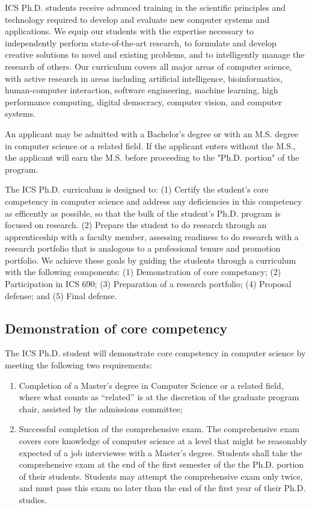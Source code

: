 \documentclass[12pt]{article}
\begin{document}
ICS Ph.D. students receive advanced training in the scientific principles and
technology required to develop and evaluate new computer systems and
applications. We equip our students with the expertise necessary to
independently perform state-of-the-art research, to formulate and develop
creative solutions to novel and existing problems, and to intelligently
manage the research of others. Our curriculum covers all major areas of
computer science, with active research in areas including artificial
intelligence, bioinformatics, human-computer interaction, software
engineering, machine learning, high performance computing, digital
democracy, computer vision, and computer systems.

An applicant may be admitted with a Bachelor's degree or with an
M.S. degree in computer science or a related field. If the applicant enters
without the M.S., the applicant will earn the M.S. before proceeding to the
"Ph.D. portion" of the program.

The ICS Ph.D. curriculum is designed to: (1) Certify the student's core
competency in computer science and address any deficiencies in this
competency as efficently as possible, so that the bulk of the student's
Ph.D. program is focused on research. (2) Prepare the student to do
research through an apprenticeship with a faculty member, assessing
readiness to do research with a research portfolio that is analogous to a
professional tenure and promotion portfolio.  We achieve these goals by
guiding the students through a curriculum with the following components:
(1) Demonstration of core competancy; (2) Participation in ICS 690; (3)
Preparation of a research portfolio; (4) Proposal defense; and (5) Final
defense.

\subsection*{Demonstration of core competency}

The ICS Ph.D. student will demonstrate core competency in computer science
by meeting the following two requirements:

\begin{enumerate}
\item Completion of a Master's degree in Computer Science or a related
  field, where what counts as ``related'' is at the discretion of the
  graduate program chair, assisted by the admissions committee;
\item Successful completion of the comprehensive exam.  The comprehensive exam
  covers core knowledge of computer science at a level that might be
  reasonably expected of a job interviewee with a Master's degree.
  Students shall take the comprehensive exam at the end of the first semester
  of the the Ph.D. portion of their students.  Students may attempt the
  comprehensive exam only twice, and must pass this exam no later than the end
  of the first year of their Ph.D. studies.  
\end{enumerate}
\end{document}
